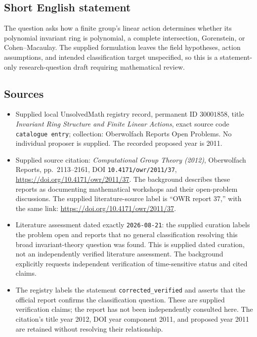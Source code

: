 \documentclass[11pt]{article}
\begin{document}
\subsection{Short English statement}
The question asks how a finite group's linear action determines whether its polynomial invariant ring is polynomial, a complete intersection, Gorenstein, or Cohen--Macaulay. The supplied formulation leaves the field hypotheses, action assumptions, and intended classification target unspecified, so this is a statement-only research-question draft requiring mathematical review.
\subsection{Sources}
\begin{itemize}
\item Supplied local UnsolvedMath registry record, permanent ID \(30001858\), title \emph{Invariant Ring Structure and Finite Linear Actions}, exact source code \texttt{catalogue entry}; collection: Oberwolfach Reports Open Problems. No individual proposer is supplied. The recorded proposed year is 2011.
\item Supplied source citation: \emph{Computational Group Theory (2012)}, Oberwolfach Reports, pp.\ 2113--2161, DOI \texttt{10.4171/owr/2011/37}, \url{https://doi.org/10.4171/owr/2011/37}. The background describes these reports as documenting mathematical workshops and their open-problem discussions. The supplied literature-source label is ``OWR report 37,'' with the same link: \url{https://doi.org/10.4171/owr/2011/37}.
\item Literature assessment dated exactly \texttt{2026-08-21}: the supplied curation labels the problem open and reports that no general classification resolving this broad invariant-theory question was found. This is supplied dated curation, not an independently verified literature assessment. The background explicitly requests independent verification of time-sensitive status and cited claims.
\item The registry labels the statement \texttt{corrected\_verified} and asserts that the official report confirms the classification question. These are supplied verification claims; the report has not been independently consulted here. The citation's title year 2012, DOI year component 2011, and proposed year 2011 are retained without resolving their relationship.
\end{itemize}
\end{document}
